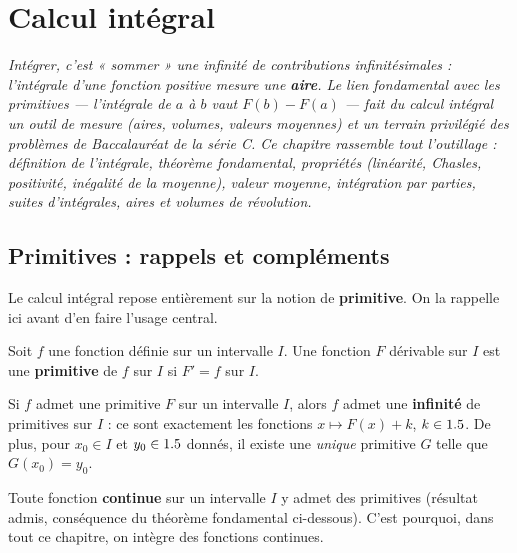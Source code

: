 \chapter{Calcul intégral}

\noindent\textit{Intégrer, c'est « sommer » une infinité de contributions infinitésimales :
l'intégrale d'une fonction positive mesure une \textbf{aire}. Le lien fondamental avec les
primitives — l'intégrale de $a$ à $b$ vaut $F(b)-F(a)$ — fait du calcul intégral un outil
de mesure (aires, volumes, valeurs moyennes) et un terrain privilégié des problèmes de Baccalauréat
de la série C. Ce chapitre rassemble tout l'outillage : définition de l'intégrale, théorème
fondamental, propriétés (linéarité, Chasles, positivité, inégalité de la moyenne), valeur moyenne,
intégration par parties, suites d'intégrales, aires et volumes de révolution.}
\vspace{8pt}

\section{Primitives : rappels et compléments}

Le calcul intégral repose entièrement sur la notion de \textbf{primitive}. On la rappelle ici
avant d'en faire l'usage central.

\begin{definition}
Soit $f$ une fonction définie sur un intervalle $I$. Une fonction $F$ dérivable sur $I$ est une
\textbf{primitive} de $f$ sur $I$ si $F'=f$ sur $I$.
\end{definition}

\begin{theoreme}
Si $f$ admet une primitive $F$ sur un intervalle $I$, alors $f$ admet une \textbf{infinité} de
primitives sur $I$ : ce sont exactement les fonctions $x\mapsto F(x)+k$, $k\in1.5$. De plus,
pour $x_0\in I$ et $y_0\in1.5$ donnés, il existe une \emph{unique} primitive $G$ telle que $G(x_0)=y_0$.
\end{theoreme}

\begin{remarque}
Toute fonction \textbf{continue} sur un intervalle $I$ y admet des primitives (résultat admis,
conséquence du théorème fondamental ci-dessous). C'est pourquoi, dans tout ce chapitre, on
intègre des fonctions continues.
\end{remarque}

